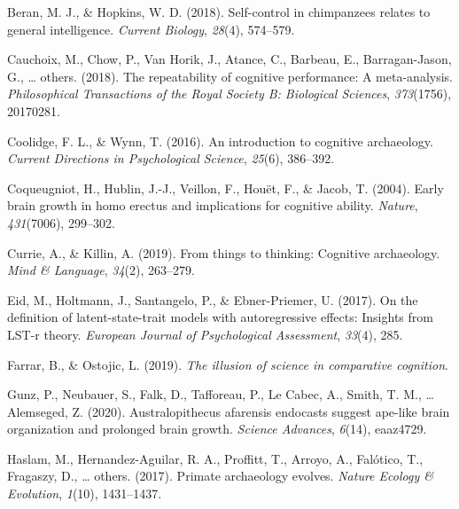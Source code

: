 \documentclass[
  man,floatsintext]{apa6}
\newlength{\cslhangindent}
\newlength{\cslentryspacingunit} %
\newenvironment{CSLReferences}[2] %
 {%
  \setlength{\parindent}{0pt}
  \ifodd #1
  \let\oldpar\par
  \def\par{\hangindent=\cslhangindent\oldpar}
  \fi
  \setlength{\parskip}{#2\cslentryspacingunit}
 }%
 {}
\begin{document}
\begingroup
\setlength{\parindent}{-0.5in}
\setlength{\leftskip}{0.5in}

\hypertarget{refs}{}
\begin{CSLReferences}{1}{0}
\leavevmode{}%
Beran, M. J., \& Hopkins, W. D. (2018). Self-control in chimpanzees relates to general intelligence. \emph{Current Biology}, \emph{28}(4), 574--579.

\leavevmode{}%
Cauchoix, M., Chow, P., Van Horik, J., Atance, C., Barbeau, E., Barragan-Jason, G., \ldots{} others. (2018). The repeatability of cognitive performance: A meta-analysis. \emph{Philosophical Transactions of the Royal Society B: Biological Sciences}, \emph{373}(1756), 20170281.

\leavevmode{}%
Coolidge, F. L., \& Wynn, T. (2016). An introduction to cognitive archaeology. \emph{Current Directions in Psychological Science}, \emph{25}(6), 386--392.

\leavevmode{}%
Coqueugniot, H., Hublin, J.-J., Veillon, F., Houët, F., \& Jacob, T. (2004). Early brain growth in homo erectus and implications for cognitive ability. \emph{Nature}, \emph{431}(7006), 299--302.

\leavevmode{}%
Currie, A., \& Killin, A. (2019). From things to thinking: Cognitive archaeology. \emph{Mind \& Language}, \emph{34}(2), 263--279.

\leavevmode{}%
Eid, M., Holtmann, J., Santangelo, P., \& Ebner-Priemer, U. (2017). On the definition of latent-state-trait models with autoregressive effects: Insights from LST-r theory. \emph{European Journal of Psychological Assessment}, \emph{33}(4), 285.

\leavevmode{}%
Farrar, B., \& Ostojic, L. (2019). \emph{The illusion of science in comparative cognition}.

\leavevmode{}%
Gunz, P., Neubauer, S., Falk, D., Tafforeau, P., Le Cabec, A., Smith, T. M., \ldots{} Alemseged, Z. (2020). Australopithecus afarensis endocasts suggest ape-like brain organization and prolonged brain growth. \emph{Science Advances}, \emph{6}(14), eaaz4729.

\leavevmode{}%
Haslam, M., Hernandez-Aguilar, R. A., Proffitt, T., Arroyo, A., Falótico, T., Fragaszy, D., \ldots{} others. (2017). Primate archaeology evolves. \emph{Nature Ecology \& Evolution}, \emph{1}(10), 1431--1437.


\end{CSLReferences}
\end{document}
